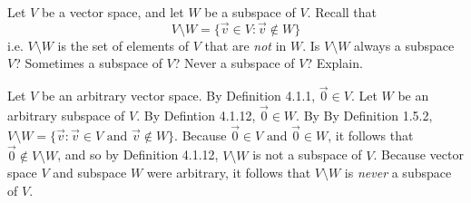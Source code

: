 \documentclass[12pt]{article}
\newenvironment{problem}[2][Problem]
{
	\begin{trivlist} 
		\item[\hskip \labelsep {\bfseries #1 #2:}]
	}
{
	\end{trivlist}
	}
\newenvironment{solution}[1][Solution]
{
	\begin{trivlist} 
		\item[\hskip \labelsep {\itshape #1:}]
	}
	{
	\end{trivlist}
}
\begin{document}
\newpage
\begin{problem}{5}
Let $V$ be a vector space, and let $W$ be a subspace of $V$. Recall that
\[
V \setminus W = \{ \vec{v} \in V : \vec{v} \notin W \}
\]
i.e. $V \setminus W$ is the set of elements of $V$ that are {\it not} in $W$. Is $V \setminus W$ always a subspace $V$? Sometimes a subspace of $V$? Never a subspace of $V$? Explain.
\noindent
\newline
\newline
\begin{solution}
Let $V$ be an arbitrary vector space. By Definition 4.1.1, $\vec{0} \in V$. Let $W$ be an arbitrary subspace of $V$. By Defintion 4.1.12, $\vec{0} \in W$. By By Definition 1.5.2, $V \setminus W = \{ \vec{v}: \vec{v} \in V \text{ and } \vec{v} \notin W \}$. Because $\vec{0} \in V \text{ and } \vec{0} \in W$, it follows that $\vec{0} \notin V \setminus W$, and so by Definition 4.1.12, $V \setminus W$ is not a subspace of $V$. Because vector space $V$ and subspace $W$ were arbitrary, it follows that $V \setminus W$ is {\it never} a subspace of $V$.
\end{solution}
\end{problem}
\end{document}
